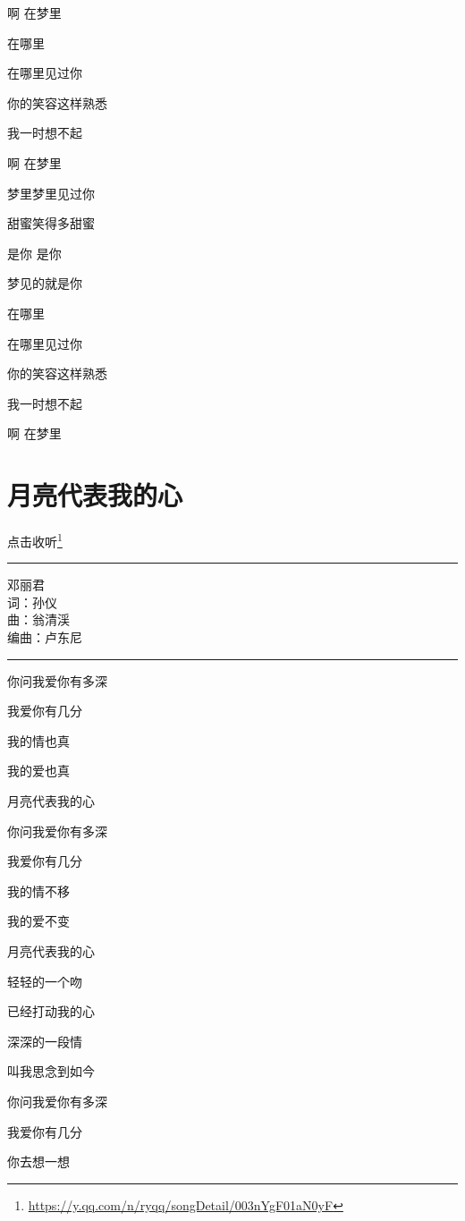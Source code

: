 \documentclass[]{ctexbook}
\renewcommand{\href}[2]{#2\footnote{\url{#1}}}
\begin{document}
啊 在梦里

在哪里

在哪里见过你

你的笑容这样熟悉

我一时想不起

啊 在梦里

梦里梦里见过你

甜蜜笑得多甜蜜

是你 是你

梦见的就是你

在哪里

在哪里见过你

你的笑容这样熟悉

我一时想不起

啊 在梦里

\section*{月亮代表我的心}\label{my-heart-is-moon}


\href{https://y.qq.com/n/ryqq/songDetail/003nYgF01aN0yF}{点击收听}

\begin{center}\rule{0.5\linewidth}{0.5pt}\end{center}

邓丽君\\
词：孙仪\\
曲：翁清渓\\
编曲：卢东尼

\begin{center}\rule{0.5\linewidth}{0.5pt}\end{center}

你问我爱你有多深

我爱你有几分

我的情也真

我的爱也真

月亮代表我的心

你问我爱你有多深

我爱你有几分

我的情不移

我的爱不变

月亮代表我的心

轻轻的一个吻

已经打动我的心

深深的一段情

叫我思念到如今

你问我爱你有多深

我爱你有几分

你去想一想
\end{document}
